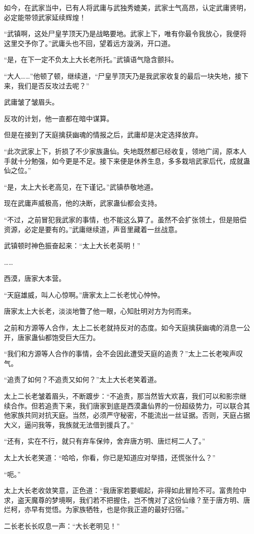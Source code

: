 \begin{this_body}
如今，在武家当中，已有人将武庸与武独秀媲美，武家士气高昂，认定武庸贤明，必定能带领武家延续辉煌！

“武镇啊，这处尸皇芋顶天乃是战略要地。武家上下，唯有你最令我放心，我便将这里交予你了。”武庸头也不回，望着远方漩涡，开口道。

“是，在下一定不负太上大长老所托。”武镇语气隐含颤抖。

“大人……”他顿了顿，继续道，“尸皇芋顶天乃是我武家收复的最后一块失地，接下来，我们是否反攻过去呢？”

武庸皱了皱眉头。

反攻的计划，他一直都在暗中谋算。

但是在接到了天庭擒获幽魂的情报之后，武庸却是决定选择放弃。

“此次武家上下，折损了不少家族蛊仙。失地既然都已经收复，领地广阔，原本人手就十分勉强，如今更是不足。接下来便是休养生息，多多栽培武家后代，成就蛊仙之位。”

“是，太上大长老高见，在下谨记。”武镇恭敬地道。

现在武庸声威极高，他的决断，武家蛊仙都会支持。

“不过，之前冒犯我武家的事情，也不能这么算了。虽然不会扩张领土，但是赔偿资源，必定是要有的。”武庸继续道，声音里藏着一丝战意。

武镇顿时神色振奋起来：“太上大长老英明！”

……

西漠，唐家大本营。

“天庭雄威，叫人心惊啊。”唐家太上二长老忧心忡忡。

唐家太上大长老，淡淡地瞥了他一眼，心知肚明对方为何而来。

之前和方源等人合作，太上二长老就持反对的态度。如今天庭擒获幽魂的消息一公开，唐家蛊仙都饱受巨大压力。

“我们和方源等人合作的事情，会不会因此遭受天庭的追责？”太上二长老唉声叹气。

“追责了如何？不追责又如何？”太上大长老笑着道。

太上二长老皱着眉头，不断踱步：“不追责，那当然皆大欢喜，我们可以和影宗继续合作。但若追责下来，我们唐家到底是西漠蛊仙界的一份超级势力，可以联合其他家族共同对抗天庭。当然，必须严守秘密，不能流出一丝证据。否则，天庭占据大义，逼问我等，我族就无法借到援兵了。”

“还有，实在不行，就只有弃车保帅，舍弃唐方明、唐烂柯二人了。”

太上大长老笑道：“哈哈，你看，你已是知道应对举措，还慌张什么？”

“呃。”

太上大长老收敛笑意，正色道：“我唐家若要崛起，非得如此冒险不可。富贵险中求，盗天魔尊的梦境啊，我们若不把握住，岂不愧对了这份仙缘？至于唐方明、唐烂柯，亦早有觉悟。为家族牺牲，也是你我正道的最好归宿。”

二长老长长叹息一声：“大长老明见！”

\end{this_body}

